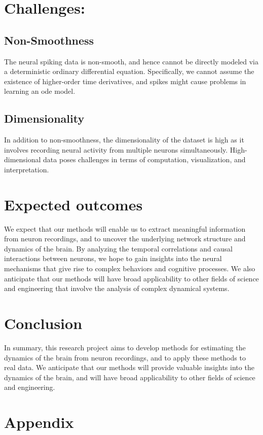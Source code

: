 \documentclass[12pt]{article}
\begin{document}
\section{Challenges:}
\subsection{Non-Smoothness}
The neural spiking data is non-smooth, and hence cannot be directly modeled via a deterministic ordinary differential equation. Specifically, we cannot assume the existence of higher-order time derivatives, and spikes might cause problems in learning an ode model. 

\subsection{Dimensionality}
In addition to non-smoothness, the dimensionality of the dataset is high as it involves recording neural activity from multiple neurons simultaneously. High-dimensional data poses challenges in terms of computation, visualization, and interpretation. 


\section{Expected outcomes}

We expect that our methods will enable us to extract meaningful information from neuron recordings, and to uncover the underlying network structure and dynamics of the brain. By analyzing the temporal correlations and causal interactions between neurons, we hope to gain insights into the neural mechanisms that give rise to complex behaviors and cognitive processes. We also anticipate that our methods will have broad applicability to other fields of science and engineering that involve the analysis of complex dynamical systems.

\section{Conclusion}

In summary, this research project aims to develop methods for estimating the dynamics of the brain from neuron recordings, and to apply these methods to real data. We anticipate that our methods will provide valuable insights into the dynamics of the brain, and will have broad applicability to other fields of science and engineering.

\section{Appendix}
\end{document}
